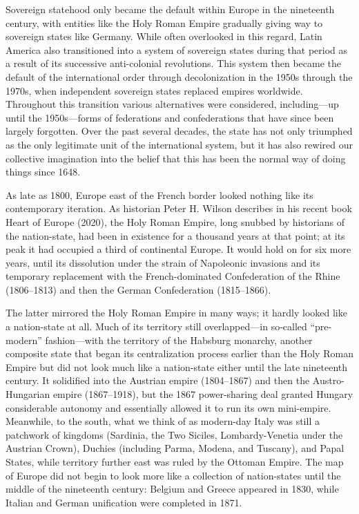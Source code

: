 \documentclass[
]{book}
\begin{document}
Sovereign statehood only became the default within Europe in the nineteenth century, with entities like the Holy Roman Empire gradually giving way to sovereign states like Germany. While often overlooked in this regard, Latin America also transitioned into a system of sovereign states during that period as a result of its successive anti-colonial revolutions. This system then became the default of the international order through decolonization in the 1950s through the 1970s, when independent sovereign states replaced empires worldwide. Throughout this transition various alternatives were considered, including---up until the 1950s---forms of federations and confederations that have since been largely forgotten. Over the past several decades, the state has not only triumphed as the only legitimate unit of the international system, but it has also rewired our collective imagination into the belief that this has been the normal way of doing things since 1648.

As late as 1800, Europe east of the French border looked nothing like its contemporary iteration. As historian Peter H. Wilson describes in his recent book Heart of Europe (2020), the Holy Roman Empire, long snubbed by historians of the nation-state, had been in existence for a thousand years at that point; at its peak it had occupied a third of continental Europe. It would hold on for six more years, until its dissolution under the strain of Napoleonic invasions and its temporary replacement with the French-dominated Confederation of the Rhine (1806--1813) and then the German Confederation (1815--1866).

The latter mirrored the Holy Roman Empire in many ways; it hardly looked like a nation-state at all. Much of its territory still overlapped---in so-called ``pre-modern'' fashion---with the territory of the Habsburg monarchy, another composite state that began its centralization process earlier than the Holy Roman Empire but did not look much like a nation-state either until the late nineteenth century. It solidified into the Austrian empire (1804--1867) and then the Austro-Hungarian empire (1867--1918), but the 1867 power-sharing deal granted Hungary considerable autonomy and essentially allowed it to run its own mini-empire. Meanwhile, to the south, what we think of as modern-day Italy was still a patchwork of kingdoms (Sardinia, the Two Siciles, Lombardy-Venetia under the Austrian Crown), Duchies (including Parma, Modena, and Tuscany), and Papal States, while territory further east was ruled by the Ottoman Empire. The map of Europe did not begin to look more like a collection of nation-states until the middle of the nineteenth century: Belgium and Greece appeared in 1830, while Italian and German unification were completed in 1871.
\end{document}
